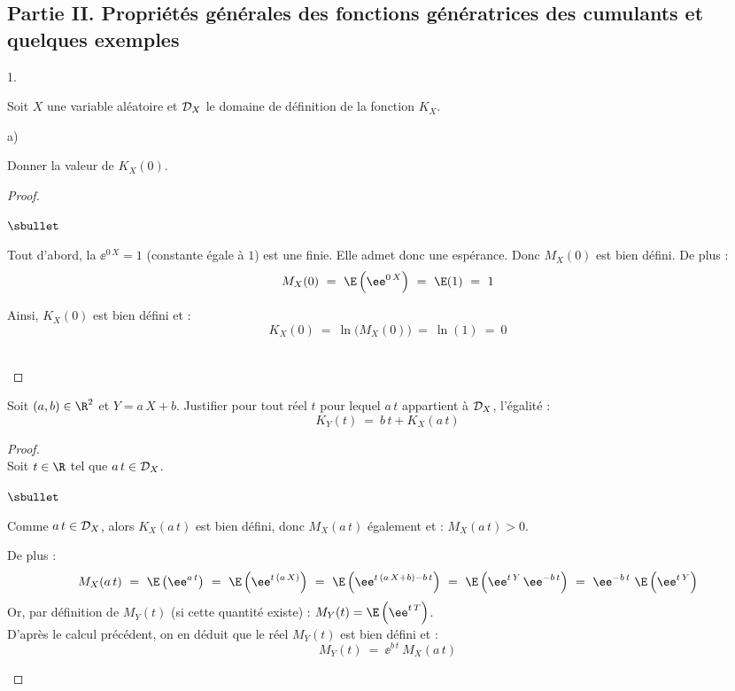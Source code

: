 \documentclass[11pt]{article}%
\begin{document}
\newpage


\subsection*{Partie II. Propriétés générales des fonctions
  génératrices des cumulants et quelques exemples}

\begin{noliste}{1.}
  \setlength{\itemsep}{4mm}
  \setcounter{enumi}{4}
\item Soit $X$ une variable aléatoire et ${\cal D}_X$ le domaine de
  définition de la fonction $K_X$.
  \begin{noliste}{a)}
    \setlength{\itemsep}{2mm}
  \item Donner la valeur de $K_X(0)$.
    \begin{proof}~
      \begin{noliste}{$\sbullet$}
      \item Tout d'abord, la \var $\ee^{0 \, X} = 1$ (\var constante
        égale à $1$) est une \var finie. Elle admet donc une
        espérance. Donc $M_X(0)$ est bien défini. De plus :
        \[
          M_X(0) \ = \ \E\left(\ee^{0 \, X}\right) \ = \ \E(1) \ = \ 1
        \]
        
      \item Ainsi, $K_X(0)$ est bien défini et :
        \[
          K_X(0) \ = \ \ln\big(M_X(0)\big) \ = \ \ln(1) \ = \ 0
        \]
      \end{noliste}
      ~\\[-1cm]
    \end{proof}
    
  \item Soit $(a,b) \in \R^2$ et $Y= a \, X +b$. Justifier pour tout
    réel $t$ pour lequel $a \, t$ appartient à ${\cal D}_X$, l'égalité
    :
    \[
      K_Y(t) \ = \ b \, t + K_X(a \, t)
    \]
    \begin{proof}~\\
      Soit $t \in \R$ tel que $a \, t \in {\cal D}_X$.
      \begin{noliste}{$\sbullet$}
      \item Comme $a \, t \in {\cal D}_X$, alors $K_X(a \, t)$ est
        bien défini, donc $M_X(a \, t)$ également et : $M_X(a \, t) >0$.
        
      \item De plus :
        \[
          M_X(a \, t)
          \ = \ \E\left(\ee^{a \, t}\right) \ = \ \E\left(\ee^{t \,
              (a \, X)}\right)
          \ = \ \E\left(\ee^{t \, (a \, X +b) -b \, t}\right)
          \ = \ \E\left(\ee^{t \, Y} \, \ee^{-b \, t}\right)
          \ = \ \ee^{-b \, t} \ \E\left(\ee^{t \, Y}\right)
        \]
        Or, par définition de $M_Y(t)$ (si cette quantité existe) :
        $M_Y(t) = \E\left(\ee^{t \, T}\right)$.\\
        D'après le calcul précédent, on en déduit que le réel $M_Y(t)$
        est bien défini et :
        \[
          M_Y(t) \ = \ \ee^{b \, t} \ M_X(a \, t)
        \]
        

\end{noliste}
\end{proof}
\end{noliste}
\end{noliste}
\end{document}
